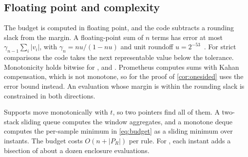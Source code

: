 \subsection{Floating point and complexity}

The budget is computed in floating point, and the code subtracts a
rounding slack from the margin. A floating-point sum of $n$ terms has error
at most $\gamma_{n-1}\sum_i|v_i|$, with $\gamma_n = nu/(1 - nu)$ and unit
roundoff $u = 2^{-53}$~\cite{higham2002accuracy}. For strict comparisons
the code takes the next representable value below the tolerance.
Monotonicity holds bitwise for ,  and .
Prometheus computes sums with Kahan compensation, which is not monotone, so
for  the proof of \cref{cor:onesided} uses the error bound
instead. An evaluation whose margin is within the rounding slack is
constrained in both directions.

Supports move monotonically with $t$, so two pointers find all of them. A
two-stack sliding queue computes the window aggregates, and a monotone
deque computes the per-sample minimum in \eqref{eq:budget} as a sliding
minimum over instants. The budget costs $O(n + |P_R|)$ per rule. For
, each instant adds a bisection of about a dozen enclosure
evaluations.
